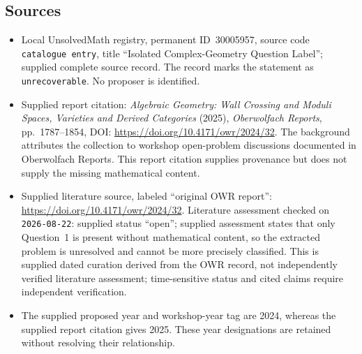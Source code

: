 \documentclass[11pt]{article}
\begin{document}
\subsection{Sources}
\begin{itemize}
\item Local UnsolvedMath registry, permanent ID~30005957, source code \texttt{catalogue entry}, title ``Isolated Complex-Geometry Question Label''; supplied complete source record. The record marks the statement as \texttt{unrecoverable}. No proposer is identified.
\item Supplied report citation: \emph{Algebraic Geometry: Wall Crossing and Moduli Spaces, Varieties and Derived Categories} (2025), \emph{Oberwolfach Reports}, pp.~1787--1854, DOI: \url{https://doi.org/10.4171/owr/2024/32}. The background attributes the collection to workshop open-problem discussions documented in Oberwolfach Reports. This report citation supplies provenance but does not supply the missing mathematical content.
\item Supplied literature source, labeled ``original OWR report'': \url{https://doi.org/10.4171/owr/2024/32}. Literature assessment checked on \texttt{2026-08-22}: supplied status ``open''; supplied assessment states that only Question~1 is present without mathematical content, so the extracted problem is unresolved and cannot be more precisely classified. This is supplied dated curation derived from the OWR record, not independently verified literature assessment; time-sensitive status and cited claims require independent verification.
\item The supplied proposed year and workshop-year tag are 2024, whereas the supplied report citation gives 2025. These year designations are retained without resolving their relationship.
\end{itemize}
\end{document}
